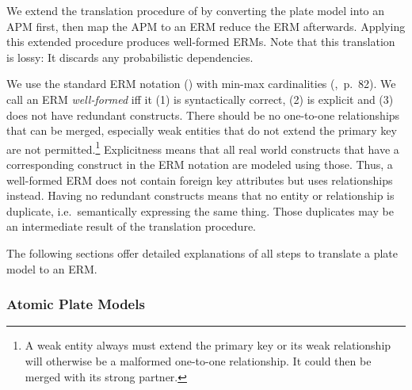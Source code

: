 
We extend the translation procedure of \textcite{heckerman2007probabilistic} by converting the plate model into an APM first, then map the APM to an ERM reduce the ERM afterwards. Applying this extended procedure produces well-formed ERMs. Note that this translation is lossy: It discards any probabilistic dependencies.

We use the standard ERM notation (\cite{chen1976entity}) with min-max cardinalities (\cite{elmasri2007database},~p.~82). We call an ERM \emph{well-formed} iff it (1) is syntactically correct, (2) is explicit and (3) does not have redundant constructs. There should be no one-to-one relationships that can be merged, especially weak entities that do not extend the primary key are not permitted.\footnote{A weak entity always must extend the primary key or its weak relationship will otherwise be a malformed one-to-one relationship. It could then be merged with its strong partner.} Explicitness means that all real world constructs that have a corresponding construct in the ERM notation are modeled using those. Thus, a well-formed ERM does not contain foreign key attributes but uses relationships instead. Having no redundant constructs means that no entity or relationship is duplicate, i.e.~semantically expressing the same thing. Those duplicates may be an intermediate result of the translation procedure.

The following sections offer detailed explanations of all steps to translate a plate model to an ERM.

\subsubsection{Atomic Plate Models}

